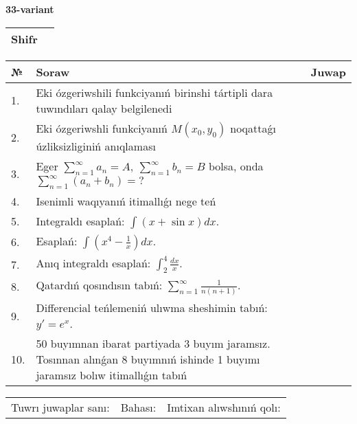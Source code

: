 \documentclass{article}
\begin{document}
  \egroup
  
  \newpage
  
  
  \textbf{33-variant}\\
  
  \bgroup
  \def\arraystretch{1.6} %
  
  \begin{tabular}{|m{5.7cm}|m{9.5cm}|}
  \hline
  Shifr & \\
  \hline
  \end{tabular}
  
  \vspace{1cm}
  
  \begin{tabular}{|m{0.7cm}|m{10cm}|m{4cm}|}
  \hline
  № & Soraw & Juwap \\
  \hline
  1. & Eki ózgeriwshili funkciyanıń birinshi tártipli dara tuwındıları qalay belgilenedi &  \\
  \hline
  2. & Eki ózgeriwshli funkciyanıń \(M(x_{0}, y_{0})\) noqattaǵı úzliksizliginiń anıqlaması &  \\
  \hline
  3. & Eger \(\sum_{n = 1}^{\infty}a_{n} = A,\ \sum_{n = 1}^{\infty}b_{n} = B\) bolsa, onda \(\sum_{n = 1}^{\infty}\left( a_{n} + b_{n} \right) = ?\) &  \\
  \hline
  4. & Isenimli waqıyanıń itimallıǵı nege teń &  \\
  \hline
  5. & Integraldı esaplań: \(\int{(x + \sin x)dx}\). &  \\
  \hline
  6. & Esaplań: \(\int\left( x^{4} - \frac{1}{x} \right)dx\). &  \\
  \hline
  7. & Anıq integraldı esaplań: \(\int_{2}^{4}\frac{dx}{x}\). &  \\
  \hline
  8. & Qatardıń qosındısın tabıń: \(\sum_{n = 1}^{\infty}\frac{1}{n(n + 1)}\). &  \\
  \hline
  9. & Differencial teńlemeniń ulıwma sheshimin tabıń: \(y' = e^{x}\). &  \\
  \hline
  10. & 50 buyımnan ibarat partiyada 3 buyım jaramsız. Tosınnan alınǵan 8 buyımnıń ishinde 1 buyımı jaramsız bolıw itimallıǵın tabıń &  \\
  \hline
  \end{tabular}
  
  \vspace{1cm}
  
  \begin{tabular}{lll}
  Tuwrı juwaplar sanı: \underline{\hspace{1.5cm}} & 
  Bahası: \underline{\hspace{1.5cm}} & 
  Imtixan alıwshınıń qolı: \underline{\hspace{2cm}} \\
  \end{tabular}
  
\end{document}
